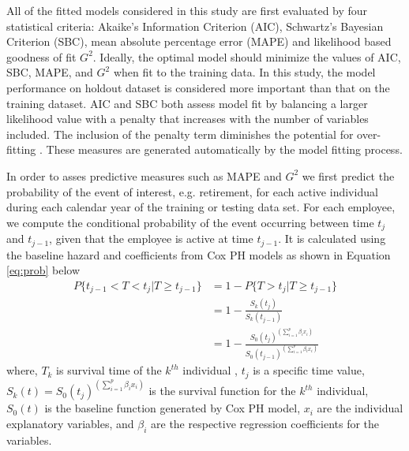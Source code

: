 \documentclass[12pt,letterpaper]{article}
\begin{document}
All of the fitted models considered in this study are first evaluated by four statistical criteria:  Akaike’s Information Criterion (AIC), Schwartz’s Bayesian Criterion (SBC), mean absolute percentage error (MAPE) and likelihood based goodness of fit $G^2$. Ideally, the optimal model should minimize the values of AIC, SBC, MAPE, and $G^2$ when fit to the training data. In this study, the model performance on holdout dataset is considered more important than that on the training dataset.
AIC and SBC both assess model fit by balancing a larger likelihood value with a penalty that increases with the number of variables included.  The inclusion of the penalty term diminishes the potential for over-fitting \citep{allison2010,hosmer2013}. These measures are generated automatically by the model fitting process.

In order to asses predictive measures such as MAPE and $G^2$ we first predict the probability of the event of interest, e.g. retirement, for each active individual during each calendar year of the training or testing data set.  For each employee, we compute the conditional probability of the event occurring between time $t_j$ and $t_{j-1}$, given that the employee is active at time $t_{j-1}$. It is calculated using the baseline hazard and coefficients from Cox PH models as shown in Equation \ref{eq:prob} below
\begin{equation}
\label{eq:prob}
\begin{split}%
P\{t_{j-1}<T<t_j|T \ge t_{j-1}\} &=1-P\{T>t_j|T \ge t_{j-1}\}\\
&=1-\frac{S_k(t_j)}{S_k{(t_{j-1})}}   \\
&=1-\frac{{S_0(t_j)}^{(\sum_{i=1}^{p}\beta_ix_i)}}{   {S_0(t_{j-1})}^{(\sum_{i=1}^{p}\beta_ix_i)}}
\end{split}
\end{equation}
where, $T_k$ is survival time of the $k^{th}$ individual , $t_j$ is a specific time value, $S_k(t) = {S_0(t_j)}^{(\sum_{i=1}^{p}\beta_ix_i)}$ is the survival function for the $k^{th}$ individual, $S_0(t)$ is the baseline function generated by Cox PH model, $x_i$ are the individual explanatory variables, and $\beta_i$ are the respective regression coefficients for the variables.
\end{document}
